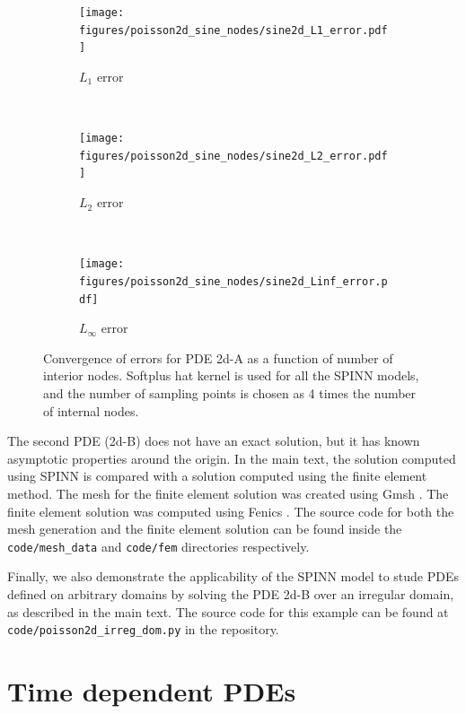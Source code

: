 \documentclass[12pt]{article}
\newcommand{\code}[1]{\lstinline{#1}}
\begin{document}
\begin{figure}
\begin{subfigure}{0.32\textwidth}
\centering
\texttt{[image: figures/poisson2d\_sine\_nodes/sine2d\_L1\_error.pdf]}
\caption{$L_1$ error}
\label{fig:2d_A_L1}
\end{subfigure}
~
\begin{subfigure}{0.32\textwidth}
\centering
\texttt{[image: figures/poisson2d\_sine\_nodes/sine2d\_L2\_error.pdf]}
\caption{$L_2$ error}
\label{fig:2d_A_L2}
\end{subfigure}
~
\begin{subfigure}{0.32\textwidth}
\centering
\texttt{[image: figures/poisson2d\_sine\_nodes/sine2d\_Linf\_error.pdf]}
\caption{$L_{\infty}$ error}
\label{fig:2d_A_Linf_a}
\end{subfigure}
\caption{Convergence of errors for PDE 2d-A as a function of number of interior nodes. Softplus hat kernel is used for all the SPINN models, and the number of sampling points is chosen as 4 times the number of internal nodes.}
\label{fig:sine2d_errors}
\end{figure}

The second PDE (2d-B) does not have an exact solution, but it has known asymptotic properties around the origin. In the main text, the solution computed using SPINN is compared with a solution computed using the finite element method. The mesh for the finite element solution was created using Gmsh \cite{gmsh}. The finite element solution was computed using Fenics \cite{AlnaesBlechta2015a, LoggMardalEtAl2012a}. The source code for both the mesh generation and the finite element solution can be found inside the \code{code/mesh_data} and \code{code/fem} directories respectively.

Finally, we also demonstrate the applicability of the SPINN model to stude PDEs defined on arbitrary domains by solving the PDE 2d-B over an irregular domain, as described in the main text. The source code for this example can be found at  \code{code/poisson2d_irreg_dom.py} in the repository.

\section{Time dependent PDEs}
\end{document}
